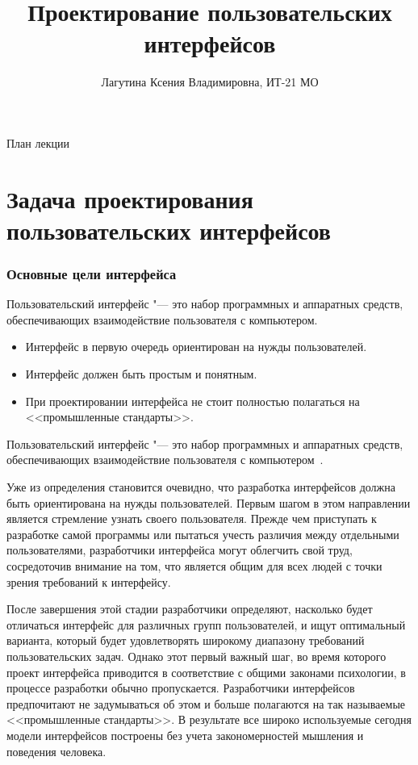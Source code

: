 \documentclass{../industrial-development}
\title{Проектирование пользовательских интерфейсов}
\author{Лагутина Ксения Владимировна, ИТ-21 МО}
\date{}
\begin{document}
\begin{frame}
  \titlepage
\end{frame}

\begin{frame}{План лекции}
  \tableofcontents
\end{frame}

\section{Задача проектирования пользовательских интерфейсов}

\begin{frame} \frametitle{Основные цели интерфейса}
  \begin{definition}
    \alert{Пользовательский интерфейс} "--- это набор программных и  аппаратных средств, обеспечивающих взаимодействие пользователя с компьютером.
  \end{definition}
  
  \begin{itemize}
   \item Интерфейс в первую очередь ориентирован на нужды пользователей.
   \item Интерфейс должен быть простым и понятным.
   \item При проектировании интерфейса не стоит полностью полагаться на <<промышленные стандарты>>.
  \end{itemize}
\end{frame}

\lecturenotes

Пользовательский интерфейс "--- это набор программных и аппаратных средств, обеспечивающих взаимодействие пользователя с компьютером~\cite{Bauman}.

Уже из определения становится очевидно, что разработка интерфейсов должна быть ориентирована на нужды пользователей. Первым шагом в этом направлении является стремление узнать своего пользователя. Прежде чем приступать к разработке самой программы или пытаться учесть различия между отдельными пользователями, разработчики интерфейса могут облегчить свой труд, сосредоточив внимание на том, что является общим для всех людей с точки зрения требований к интерфейсу.

После завершения этой стадии разработчики определяют, насколько будет отличаться интерфейс для различных групп пользователей, и ищут оптимальный варианта, который будет удовлетворять широкому диапазону требований пользовательских задач. Однако этот первый важный шаг, во время которого проект интерфейса приводится в соответствие с общими законами психологии, в процессе разработки обычно пропускается. Разработчики интерфейсов предпочитают не задумываться об этом и больше полагаются на так называемые <<промышленные стандарты>>. В результате все широко используемые сегодня модели интерфейсов построены без учета закономерностей мышления и поведения человека.
\end{document}
